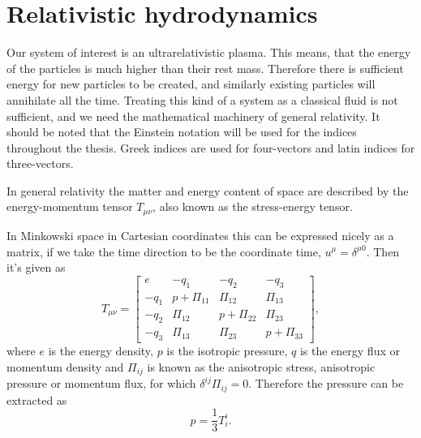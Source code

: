 \section{Relativistic hydrodynamics}
\label{rel_hydro}

Our system of interest is an ultrarelativistic plasma.
This means, that the energy of the particles is much higher than their rest mass.
Therefore there is sufficient energy for new particles to be created,
and similarly existing particles will annihilate all the time.
Treating this kind of a system as a classical fluid is not sufficient,
and we need the mathematical machinery of general relativity.
It should be noted that the Einstein notation will be used for the indices throughout the thesis.
Greek indices are used for four-vectors and latin indices for three-vectors.

In general relativity the matter and energy content of space are described by the energy-momentum tensor $T_{\mu \nu}$, also known as the stress-energy tensor.
\iffalse
Without loss of generality it can be decomposed as
\begin{equation}
T_{\mu \nu} = e u_\mu u_\nu + p h_{\mu \nu} + 2 q_{(\mu} u_{\beta)} + \Pi_{\mu \mu},
\end{equation}
where $h_{\mu \nu} = g_{\mu \nu} + u_\alpha u_\beta$ projects orthogonally to the time direction given by $u^\alpha$, $e$ is the energy density, p is the pressure, $q_\alpha$ is the energy flux or momentum density, and $\Pi_{\mu \nu}$ is the anisotropic stress or anisotropic pressure.
\fi
In Minkowski space in Cartesian coordinates this can be expressed nicely as a matrix,
if we take the time direction to be the coordinate time, $u^\mu = \delta^{\mu 0}$.
Then it's given as
\cites[eq. 4.17]{rasanen_gr_2022}[fig. 3.3]{rezzolla_relativistic_2013}
\begin{equation}
T_{\mu \nu} =
\begin{bmatrix}
e & -q_1 & -q_2 & -q_3 \\
-q_1 & p + \Pi_{11} & \Pi_{12} & \Pi_{13} \\
-q_2 & \Pi_{12} & p + \Pi_{22} & \Pi_{23} \\
-q_3 & \Pi_{13} & \Pi_{23} & p + \Pi_{33}
\end{bmatrix},
\label{eq:ep_tensor_general_matrix}
\end{equation}
where $e$ is the energy density, $p$ is the isotropic pressure, $q$ is the energy flux or momentum density and
$\Pi_{ij}$ is known as the anisotropic stress, anisotropic pressure or momentum flux,
for which $\delta^{ij} \Pi_{ij} = 0$.
Therefore the pressure can be extracted as
\begin{equation}
p = \frac{1}{3} T^i_i.
\label{eq:pressure_from_ep_tensor}
\end{equation}

